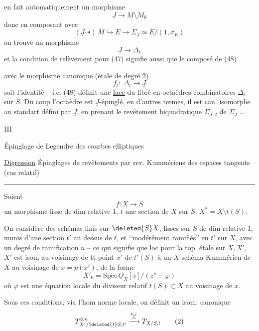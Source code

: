  en fait automatiquement un morphisme
\[
\underline J\longrightarrow M\setminus M_0
\]
donc en composant avec 
\[
(\underline J\dashrightarrow)\,M\hookrightarrow E\longrightarrow\Sigma_{\underline J}\simeq E/(1,\sigma_E)
\]
on trouve un morphisme
\[
\underline J\longrightarrow\Delta_t \tag*{(48)}
\]
et la condition de relèvement pour (47) signifie aussi que le composé de (48)

avec le morphisme canonique (étale de degré 2)
\[
f_t:\ \Delta_t\longrightarrow\underline{J}
\]
soit l'identité -- i.e. (48) définit une \uline{face} du fibré en octaèdres combinatoires $\Delta_t$ sur $S$. Du coup l'octaèdre est $\underline J$-épinglé, en d'autres termes, il est can. isomorphe au  standart défini par $\underline J$,  en prenant le revêtement biquadratique $\Sigma_{\underline J,2}$ de $\Sigma_{\underline J}$ \ldots

III

Épinglage de Legendre des courbes elliptiques

\uline{Digression} Épinglages de revêtements par  rev. Kummériens des espaces tangents (cas relatif)
\par\noindent\rule{\linewidth}{0.4pt}\par

Soient
\[
 f:X\longrightarrow S \tag*{(1)}
\]
un morphisme lisse de dim relative 1, $t$ une section de $X$ sur $S$, $X^\ast=X\setminus t(S)$.

On considère des schémas  finis sur $\deleted{S} X$, lisses sur $S$ de dim relative 1, munis d'une section $t'$ au dessus de $t$, et ``modérément ramifiés'' en $t'$ sur $X$, avec un degré de ramification $n$ -- ce qui signifie que
loc pour la top. étale sur $X,X'$, $X'$ est isom au voisinage de tt point $x'$ de $t'(S)$ à un $X$-schéma Kummérien de $X$ au voisinage de $x=p(x')$, de la forme
\[
 X'_0=\mathrm{Spec}\,\underline O_X[z]/(z^n-\varphi)
\]
où $\varphi$ est une équation locale du diviseur relatif $t(S)\subset X$ au voisinage de $x$.

Sous ces conditions, via l'hom norme locale, on définit un isom. canonique
\[
 T_{X'/\deleted{t}S,t'}^{\otimes n}\xrightarrow{\overset{k_{t'}}{\sim}}T_{X/S,t} \tag*{(2)}
\]

